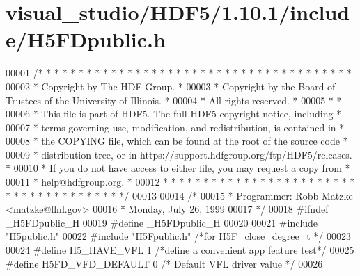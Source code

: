 \hypertarget{visual__studio_2_h_d_f5_21_810_81_2include_2_h5_f_dpublic_8h_source}{}\section{visual\+\_\+studio/\+H\+D\+F5/1.10.1/include/\+H5\+F\+Dpublic.h}
\label{visual__studio_2_h_d_f5_21_810_81_2include_2_h5_f_dpublic_8h_source}

\begin{DoxyCode}
00001 \textcolor{comment}{/* * * * * * * * * * * * * * * * * * * * * * * * * * * * * * * * * * * * * * *}
00002 \textcolor{comment}{ * Copyright by The HDF Group.                                               *}
00003 \textcolor{comment}{ * Copyright by the Board of Trustees of the University of Illinois.         *}
00004 \textcolor{comment}{ * All rights reserved.                                                      *}
00005 \textcolor{comment}{ *                                                                           *}
00006 \textcolor{comment}{ * This file is part of HDF5.  The full HDF5 copyright notice, including     *}
00007 \textcolor{comment}{ * terms governing use, modification, and redistribution, is contained in    *}
00008 \textcolor{comment}{ * the COPYING file, which can be found at the root of the source code       *}
00009 \textcolor{comment}{ * distribution tree, or in https://support.hdfgroup.org/ftp/HDF5/releases.  *}
00010 \textcolor{comment}{ * If you do not have access to either file, you may request a copy from     *}
00011 \textcolor{comment}{ * help@hdfgroup.org.                                                        *}
00012 \textcolor{comment}{ * * * * * * * * * * * * * * * * * * * * * * * * * * * * * * * * * * * * * * */}
00013 
00014 \textcolor{comment}{/*}
00015 \textcolor{comment}{ * Programmer:  Robb Matzke <matzke@llnl.gov>}
00016 \textcolor{comment}{ *              Monday, July 26, 1999}
00017 \textcolor{comment}{ */}
00018 \textcolor{preprocessor}{#ifndef \_H5FDpublic\_H}
00019 \textcolor{preprocessor}{#define \_H5FDpublic\_H}
00020 
00021 \textcolor{preprocessor}{#include "H5public.h"}
00022 \textcolor{preprocessor}{#include "H5Fpublic.h"}      \textcolor{comment}{/*for H5F\_close\_degree\_t */}
00023 
00024 \textcolor{preprocessor}{#define H5\_HAVE\_VFL 1 }\textcolor{comment}{/*define a convenient app feature test*/}\textcolor{preprocessor}{}
00025 \textcolor{preprocessor}{#define H5FD\_VFD\_DEFAULT 0   }\textcolor{comment}{/* Default VFL driver value */}\textcolor{preprocessor}{}
00026 

\end{DoxyCode}
